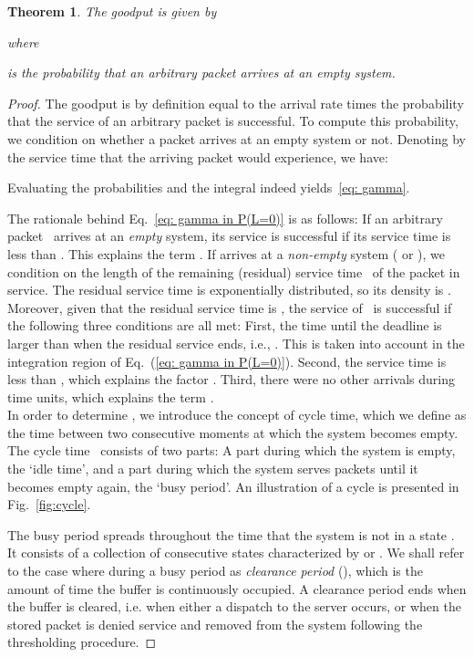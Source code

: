 \documentclass[preprint,12pt]{elsarticle}
\newtheorem{thm}{Theorem}
\theoremstyle{definition}
\theoremstyle{plain}
\theoremstyle{remark}
\begin{document}
\begin{thm} \label{theoremForReneging}
  The goodput  is given by
  
  where
  
  is the probability that an arbitrary packet arrives at an empty system.
\end{thm}
\begin{proof}
  The goodput  is by definition equal to the arrival rate times the probability that the service of an arbitrary packet is successful. To compute this probability, we condition on whether a packet arrives at an empty system or not. Denoting by  the service time that the arriving packet would experience, we have:
  

  Evaluating the probabilities and the integral indeed yields~\eqref{eq: gamma}.

The rationale behind Eq.~\eqref{eq: gamma in P(L=0)} is as follows: If an arbitrary packet~ arrives at an \emph{empty} system, its service is successful if its service time  is less than . This explains the term . If  arrives at a \emph{non-empty} system ( or ), we condition on the length of the remaining (residual) service time~ of the packet in service. The residual service time is exponentially distributed, so its density is . Moreover, given that the residual service time is , the service of~ is successful if the following three conditions are all met: First, the time until the deadline is larger than  when the residual service ends, i.e., . This is taken into account in the integration region of Eq.~(\ref{eq: gamma in P(L=0)}). Second, the service time is less than , which explains the factor . Third, there were no other arrivals during  time units, which explains the term .\\


In order to determine , we introduce the concept of cycle time, which we define as the time between two consecutive moments at which the system becomes empty. The cycle time~ consists of two parts: A part during which the system is empty, the `idle time', and a part during which the system serves packets until it becomes empty again, the `busy period'. An illustration of a cycle is presented in Fig.~\ref{fig:cycle}.

The busy period spreads throughout the time that the system is not in a state . It consists of a collection of consecutive states characterized by  or . We shall refer to the case where  during a busy period as \textit{clearance period} (), which is the amount of time the buffer is continuously occupied. A clearance period ends when the buffer is cleared, i.e. when either a dispatch to the server occurs, or when the stored packet is denied service and removed from the system following the thresholding procedure.



\end{proof}
\end{document}
